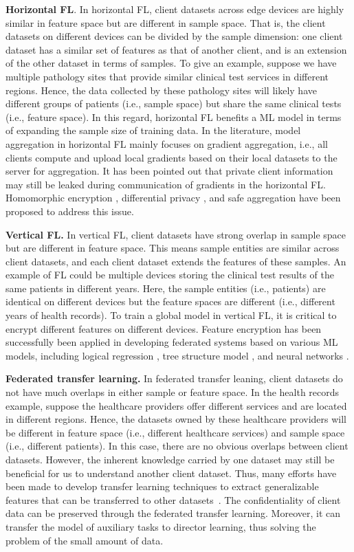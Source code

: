 \documentclass[10pt,journal,compsoc]{IEEEtran}
\begin{document}
\textbf{Horizontal FL}. In horizontal FL, client datasets across edge devices are highly similar in feature space but are different in sample space. That is, the client datasets on different devices can be divided by the sample dimension: one client dataset has a similar set of features as that of another client, and is an extension of the other dataset in terms of samples. To give an example, suppose we have multiple pathology sites that provide similar clinical test services in different regions. Hence, the data collected by these pathology sites will likely have different groups of patients (i.e., sample space) but share the same clinical tests (i.e., feature space). In this regard, horizontal FL benefits a ML model in terms of expanding the sample size of training data. In the literature, model aggregation in horizontal FL mainly focuses on gradient aggregation, i.e., all clients compute and upload local gradients based on their local datasets to the server for aggregation. It has been pointed out that private client information may still be leaked during communication of gradients in the horizontal FL. Homomorphic encryption \cite{yuan2013privacy}, differential privacy \cite{huang2020dp}, and safe aggregation \cite{mohassel2017secureml} have been proposed to address this issue.

\textbf{Vertical FL.} In vertical FL, client datasets have strong overlap in sample space but are different in feature space. This means sample entities are similar across client datasets, and each client dataset extends the features of these samples. An example of FL could be multiple devices storing the clinical test results of the same patients in different years. Here, the sample entities (i.e., patients) are identical on different devices but the feature spaces are different (i.e., different years of health records). To train a global model in vertical FL, it is critical to encrypt different features on different devices. Feature encryption has been successfully been applied in developing federated systems based on various ML models, including logical regression \cite{he2021secure}, tree structure model \cite{chen2021fed}, and neural networks \cite{dai2021vertical}.

\textbf{Federated transfer learning.} In federated transfer leaning, client datasets do not have much overlaps in either sample or feature space. In the health records example, suppose the healthcare providers offer different services and are located in different regions. Hence, the datasets owned by these healthcare providers will be different in feature space (i.e., different healthcare services) and sample space (i.e., different patients). In this case, there are no obvious overlaps between client datasets. However, the inherent knowledge carried by one dataset may still be beneficial for us to understand another client dataset. Thus, many efforts have been made to develop transfer learning techniques to extract generalizable features that can be transferred to other datasets~\cite{zhang2022transfer}. The confidentiality of client data can be preserved through the federated transfer learning. Moreover, it can transfer the model of auxiliary tasks to director learning, thus solving the problem of the small amount of data.
\end{document}
